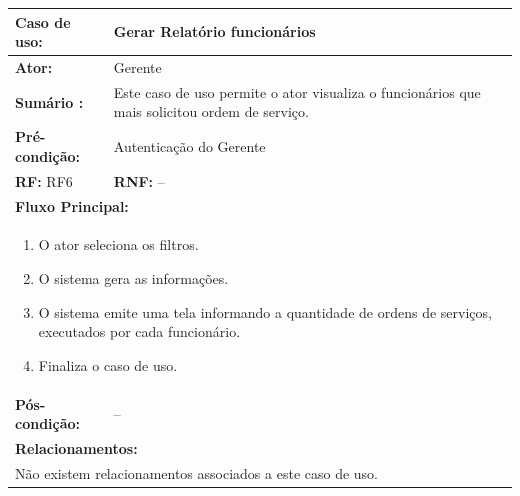 \documentclass[
	12pt,				%
	openright,
	oneside,			%
	a4paper,			%
	chapter=TITLE,		%
	brazil				%
	]{abntex2}
\begin{document}
\begin{table}[h]
\centering
\begin{tabular}{|p{3cm}|p{3cm}|p{3cm}|p{3cm}|}
\hline
\textbf{Caso de uso:}             & \multicolumn{3}{p{9cm}|}{Gerar Relatório funcionários}				 \\ \hline
\textbf{Ator:}                 & \multicolumn{3}{p{9cm}|}{Gerente}         			          						 	\\ \hline
\textbf{Sumário :}                & \multicolumn{3}{p{9cm}|}{Este caso de uso permite o ator visualiza %
													o funcionários que mais solicitou ordem de serviço.}         	\\ \hline
\textbf{Pré-condição:}            & \multicolumn{3}{p{9cm}|}{ Autenticação do Gerente }                				    \\ \hline
\multicolumn{2}{|p{6cm}|}{\textbf{RF:} RF6 }                  & \multicolumn{2}{p{6cm}|}{\textbf{RNF:} --}     	    \\ \hline
\multicolumn{4}{|p{12cm}|}{\textbf{Fluxo Principal:}}                                                					\\ \hline
\multicolumn{4}{|p{12cm}|}{%
\begin{enumerate}
  \item O ator seleciona os filtros.
  \item O sistema gera as informações.
  \item O sistema emite uma tela informando a quantidade de ordens de serviços, executados por cada funcionário.
  \item Finaliza o caso de uso.
\end{enumerate}}                                                               				 							\\ \hline
\textbf{Pós-condição: }  & \multicolumn{3}{p{9cm}|}{ -- }		\\ \hline
\multicolumn{4}{|p{12cm}|}{\textbf{Relacionamentos:}}                                        								\\ \hline
\multicolumn{4}{|p{12cm}|}{Não existem relacionamentos associados a este caso de uso.}                                  \\ \hline
\end{tabular}
\end{table}
\end{document}
